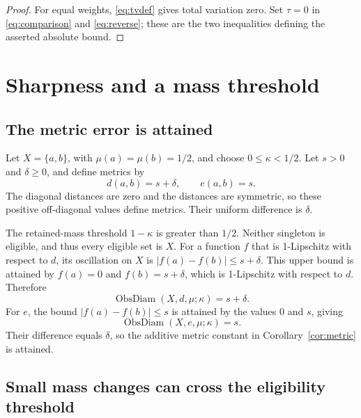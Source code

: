 \documentclass[a4paper,11pt]{article}
\DeclareMathOperator{\ObsDiam}{ObsDiam}
\begin{document}
\begin{proof}
For equal weights, \eqref{eq:tvdef} gives total variation zero.
Set $\tau=0$ in \eqref{eq:comparison} and \eqref{eq:reverse}; these
are the two inequalities defining the asserted absolute bound.
\end{proof}

\section{Sharpness and a mass threshold}

\subsection{The metric error is attained}

Let $X=\{a,b\}$, with $\mu(a)=\mu(b)=1/2$, and choose
$0\le\kappa<1/2$. Let $s>0$ and $\delta\ge0$, and define metrics by
\[
 d(a,b)=s+\delta,\qquad e(a,b)=s.
\]
The diagonal distances are zero and the distances are symmetric, so
these positive off-diagonal values define metrics. Their uniform
difference is $\delta$.

The retained-mass threshold $1-\kappa$ is greater than $1/2$.
Neither singleton is eligible, and thus every eligible set is $X$.
For a function $f$ that is 1-Lipschitz with respect to $d$, its oscillation on $X$ is
$|f(a)-f(b)|\le s+\delta$. This upper bound is attained by
$f(a)=0$ and $f(b)=s+\delta$, which is 1-Lipschitz with respect to $d$. Therefore
\[
 \ObsDiam(X,d,\mu;\kappa)=s+\delta.
\]
For $e$, the bound $|f(a)-f(b)|\le s$ is attained by the values
$0$ and $s$, giving
\[
 \ObsDiam(X,e,\mu;\kappa)=s.
\]
Their difference equals $\delta$, so the additive metric constant in
Corollary~\ref{cor:metric} is attained.

\subsection{Small mass changes can cross the eligibility threshold}
\end{document}

